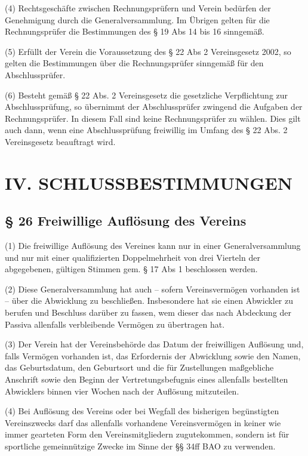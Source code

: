 \documentclass[11pt,a4paper]{article}
\begin{document}
(4)
Rechtsgeschäfte zwischen Rechnungsprüfern und Verein bedürfen der Genehmigung durch die Generalversammlung.
Im Übrigen gelten für die Rechnungsprüfer die Bestimmungen des § 19 Abs 14 bis 16 sinngemäß.

(5)
Erfüllt der Verein die Voraussetzung des § 22 Abs 2 Vereinsgesetz 2002, so gelten die Bestimmungen über die Rechnungsprüfer sinngemäß für den Abschlussprüfer.

(6)
Besteht gemäß § 22 Abs. 2 Vereinsgesetz die gesetzliche Verpflichtung zur Abschlussprüfung, so übernimmt der Abschlussprüfer zwingend die Aufgaben der Rechnungsprüfer.
In diesem Fall sind keine Rechnungsprüfer zu wählen.
Dies gilt auch dann, wenn eine Abschlussprüfung freiwillig im Umfang des § 22 Abs. 2 Vereinsgesetz beauftragt wird.

\section{IV. SCHLUSSBESTIMMUNGEN}

\subsection{§ 26
Freiwillige Auflösung des Vereins}

(1)
Die freiwillige Auflösung des Vereines kann nur in einer Generalversammlung und nur mit einer qualifizierten Doppelmehrheit von drei Vierteln der abgegebenen, gültigen Stimmen gem. § 17 Abs 1 beschlossen werden.

(2)
Diese Generalversammlung hat auch – sofern Vereinsvermögen vorhanden ist – über die Abwicklung zu beschließen.
Insbesondere hat sie einen Abwickler zu berufen und Beschluss darüber zu fassen, wem dieser das nach Abdeckung der Passiva allenfalls verbleibende Vermögen zu übertragen hat.

(3)
Der Verein hat der Vereinsbehörde das Datum der freiwilligen Auflösung und, falls Vermögen vorhanden ist, das Erfordernis der Abwicklung sowie den Namen, das Geburtsdatum, den Geburtsort und die für Zustellungen maßgebliche Anschrift sowie den Beginn der Vertretungsbefugnis eines allenfalls bestellten Abwicklers binnen vier Wochen nach der Auflösung mitzuteilen.

(4)
Bei Auflösung des Vereins oder bei Wegfall des bisherigen begünstigten Vereinszwecks darf das allenfalls vorhandene Vereinsvermögen in keiner wie immer gearteten Form den Vereinsmitgliedern zugutekommen, sondern ist für sportliche gemeinnützige Zwecke im Sinne der §§ 34ff BAO zu verwenden.
\end{document}
